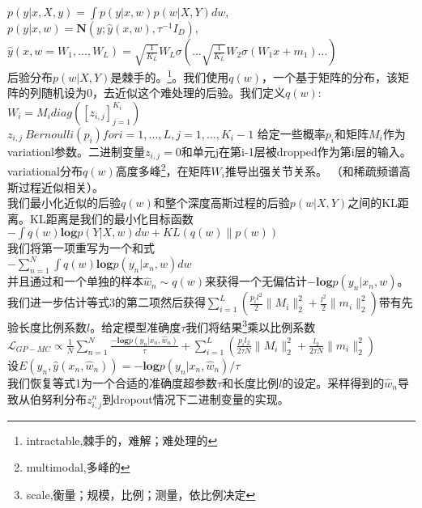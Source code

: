 \documentclass[2pt,a4paper]{article}
\begin{document}
$p(y|x,X,y)=\int p(y|x,w)p(w|X,Y)dw$,\\
$p(y|x,w)=\mathbf{N}(y;\hat{y}(x,w),\tau^{-1}I_D)$,\\
$\hat{y}(x,w={W_1,...,W_L})=\sqrt{\frac{1}{K_L}}W_L\sigma(...\sqrt{\frac{1}{K_L}}W_2\sigma(W_1x+m_1)...)$\\
后验分布$p(w|X,Y)$是棘手的。\footnote{intractable,棘手的，难解；难处理的}。我们使用$q(w)$，一个基于矩阵的分布，该矩阵的列随机设为0，去近似这个难处理的后验。我们定义$q(w)$:\\
$W_i=M_idiag([z_{i,j}]_{j=1}^{K_i})$\\
$z_{i,j}~Bernoulli(p_i) for i=1,...,L,j=1,...,K_i-1$
给定一些概率$p_i$和矩阵$M_i$作为variationl参数。二进制变量$z_{i,j}=0$和单元j在第i-1层被dropped作为第i层的输入。variational分布$q(w)$高度多峰\footnote{multimodal,多峰的}，在矩阵$W_i$推导出强关节关系。
（和稀疏频谱高斯过程近似相关）。\\
我们最小化近似的后验$q(w)$和整个深度高斯过程的后验$p(w|X,Y)$之间的KL距离。KL距离是我们的最小化目标函数\\
$-\int q(w)\mathbf{log} p(Y|X,w)dw+KL(q(w)\parallel p(w))$\\
我们将第一项重写为一个和式\\
$-\sum_{n=1}^N \int q(w)\mathbf{log}p(y_n|x_n,w)dw$\\
并且通过和一个单独的样本$\hat{w}_n\sim q(w)$来获得一个无偏估计$-\mathbf{log}p(y_n|x_n,w)$。我们进一步估计等式3的第二项然后获得$\sum _{i=1}^L(\frac{p_il^2}{2}\parallel M_i \parallel _2^2+\frac{l^2}{2}\parallel m_i \parallel _2^2)$带有先验长度比例系数$l$。给定模型准确度$\tau$我们将结果\footnote{scale,衡量；规模，比例；测量，依比例决定}乘以比例系数$\mathcal{L}_{GP-MC}\propto \frac{1}{N}\sum _{n=1}^N \frac{-\mathbf{log} p(y_n|x_n,\hat{w}_n)}{\tau}+\sum _{i=1}^L(\frac{p_il_2}{2\tau N}\parallel M_i \parallel _2^2+\frac{l_2}{2\tau N}\parallel m_i \parallel _2^2)$\\
设$E(y_n,\hat{y}(x_n,\hat{w}_n))=-\mathbf{log} p(y_n|x_n,\hat{w}_n)/\tau$\\
我们恢复等式1为一个合适的准确度超参数$\tau$和长度比例$l$的设定。采样得到的$\hat{w}_n$导致从伯努利分布$z_{i,j}^n$到dropout情况下二进制变量的实现。
\end{document}
